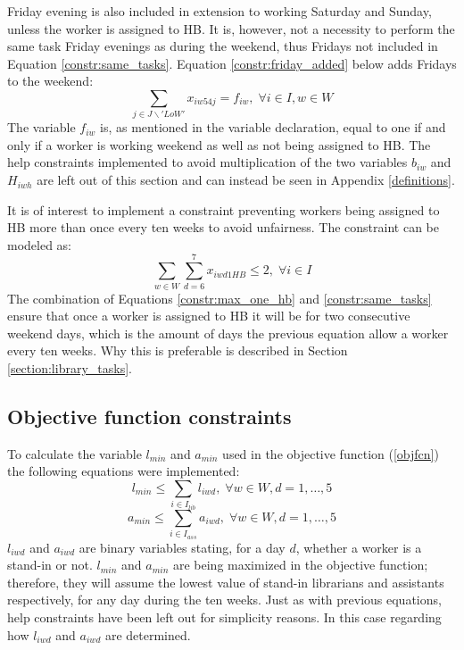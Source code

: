 Friday evening is also included in extension to working Saturday and Sunday, unless the worker is assigned to HB. It is, however, not a necessity to perform the same task Friday evenings as during the weekend, thus Fridays not included in Equation \ref{constr:same_tasks}. Equation \ref{constr:friday_added} below adds Fridays to the weekend:
\begin{equation} \label{constr:friday_added}
\sum_{j \in J \backslash 'LoW'}x_{iw54j} = f_{iw}, \; \forall i \in I, w \in W
\end{equation}
The variable $f_{iw}$ is, as mentioned in the variable declaration, equal to one if and only if a worker is working weekend as well as not being assigned to HB. The help constraints implemented to avoid multiplication of the two variables $b_{iw}$ and $H_{iwh}$ are left out of this section and can instead be seen in Appendix \ref{definitions}.

It is of interest to implement a constraint preventing workers being assigned to HB more than once every ten weeks to avoid unfairness. The constraint can be modeled as:
\begin{equation} \label{constr:max_one_hb}
\sum_{w \in W}\sum_{d = 6}^{7}x_{iwd1HB} \leq 2, \; \forall i \in I
\end{equation}
The combination of Equations \ref{constr:max_one_hb} and \ref{constr:same_tasks} ensure that once a worker is assigned to HB it will be for two consecutive weekend days, which is the amount of days the previous equation allow a worker every ten weeks. Why this is preferable is described in Section \ref{section:library_tasks}.

\subsection{Objective function constraints} \label{section:obj_fcn_constraints}
To calculate the variable $l_{min}$ and $a_{min}$ used in the objective function (\ref{objfcn}) the following equations were implemented:
\begin{equation} \label{constr:l_min}
l_{min} \leq \sum_{i \in I_{lib}} l_{iwd}, \; \forall w \in W, d=1, \ldots, 5
\end{equation}
\begin{equation} \label{constr:a_min}
a_{min} \leq \sum_{i \in I_{ass}} a_{iwd}, \; \forall w \in W, d=1, \ldots, 5
\end{equation}
$l_{iwd}$ and $a_{iwd}$ are binary variables stating, for a day $d$, whether a worker is a stand-in or not. $l_{min}$ and $a_{min}$ are being maximized in the objective function; therefore, they will assume the lowest value of stand-in librarians and assistants respectively, for any day during the ten weeks. Just as with previous equations, help constraints have been left out for simplicity reasons. In this case regarding how $l_{iwd}$ and $a_{iwd}$ are determined.

